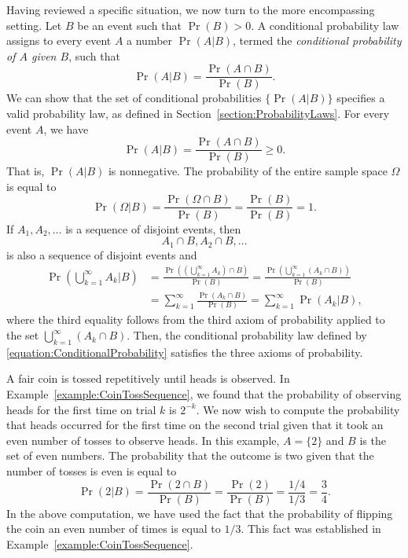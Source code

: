 Having reviewed a specific situation, we now turn to the more encompassing setting.
Let $B$ be an event such that $\Pr (B) > 0$.
A conditional probability law assigns to every event $A$ a number $\Pr (A|B)$, termed the \emph{conditional probability of $A$ given $B$}, such that 
\begin{equation} \label{equation:ConditionalProbability}
\Pr (A | B) = \frac{\Pr (A \cap B)}{\Pr (B)}.
\end{equation}
We can show that the set of conditional probabilities $\{ \Pr (A | B) \}$ specifies a valid probability law, as defined in Section~\ref{section:ProbabilityLaws}.
For every event $A$, we have
\begin{equation*}
\Pr (A|B) = \frac{\Pr (A \cap B)}{\Pr (B)} \geq 0.
\end{equation*}
That is, $\Pr (A|B)$ is nonnegative.
The probability of the entire sample space $\Omega$ is equal to
\begin{equation*}
\Pr (\Omega | B) = \frac{\Pr (\Omega \cap B)}{\Pr (B)}
= \frac{\Pr (B)}{\Pr (B)} = 1 .
\end{equation*}
If $A_1, A_2, \ldots$ is a sequence of disjoint events, then
\begin{equation*}
A_1 \cap B, A_2 \cap B, \ldots
\end{equation*}
is also a sequence of disjoint events and
\begin{equation*}
\begin{split}
\Pr \left( \bigcup_{k=1}^{\infty} A_k \Big| B \right)
&= \frac{\Pr \left( \left( \bigcup_{k=1}^{\infty} A_k \right) \cap B \right)}{\Pr (B)}
= \frac{\Pr \left( \bigcup_{k=1}^{\infty} (A_k \cap B ) \right)}{\Pr (B)} \\
&= \sum_{k = 1}^{\infty} \frac{ \Pr (A_k \cap B ) }{\Pr (B)}
= \sum_{k = 1}^{\infty} \Pr (A_k | B) ,
\end{split}
\end{equation*}
where the third equality follows from the third axiom of probability applied to the set $\bigcup_{k=1}^{\infty} (A_k \cap B )$.
Then, the conditional probability law defined by \eqref{equation:ConditionalProbability} satisfies the three axioms of probability.

\begin{example}
A fair coin is tossed repetitively until heads is observed.
In Example~\ref{example:CoinTossSequence}, we found that the probability of observing heads for the first time on trial $k$ is $2^{-k}$.
We now wish to compute the probability that heads occurred for the first time on the second trial given that it took an even number of tosses to observe heads.
In this example, $A = \{ 2 \}$ and $B$ is the set of even numbers.
The probability that the outcome is two given that the number of tosses is even is equal to
\begin{equation*}
\Pr ( 2 | B )
= \frac{\Pr ( 2 \cap B )}{\Pr (B)}
= \frac{\Pr (2)}{\Pr (B)}
= \frac{1/4}{1/3}
= \frac{3}{4} .
\end{equation*}
In the above computation, we have used the fact that the probability of flipping the coin an even number of times is equal to $1/3$.
This fact was established in Example~\ref{example:CoinTossSequence}.
\end{example}

